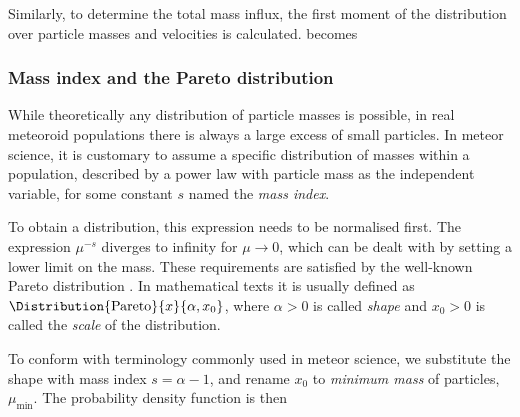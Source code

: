            Similarly, to determine the total mass influx, the first moment
            of the distribution over particle masses and velocities is calculated.
             becomes

        \subsubsection{Mass index and the Pareto distribution} \label{moms}
            While theoretically any distribution of particle masses is possible,
            in real meteoroid populations there is always a large excess of small particles.
            In meteor science, it is customary to assume a specific distribution of masses within a population,
            described by a power law with particle mass as the independent variable,
            for some constant $s$ named the \emph{mass index}.

            To obtain a distribution, this expression needs to be normalised first.
            The expression $\mu^{-s}$ diverges to infinity for $\mu \to 0$,
            which can be dealt with by setting a lower limit on the mass.
            These requirements are satisfied by the well-known Pareto distribution \citep{arnold1983}.
            In mathematical texts it is usually defined as $\Distribution{\mathrm{Pareto}}{x}{\alpha, x_0}$,
            where $\alpha > 0$ is called \emph{shape} and $x_0 > 0$ is called the \emph{scale} of the distribution.

            To conform with terminology commonly used in meteor science, we substitute the shape with mass index
            $s = \alpha - 1$, and rename $x_0$ to \emph{minimum mass} of particles, $\mu_\mathrm{min}$.
            The probability density function is then

